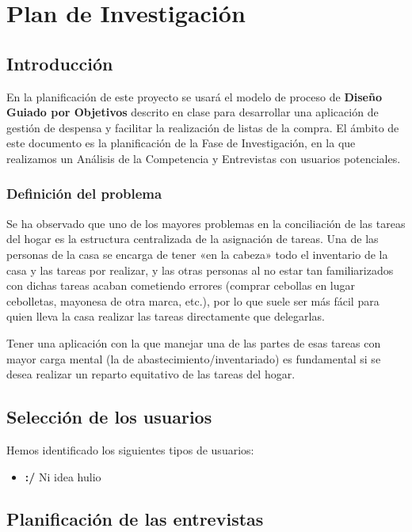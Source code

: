 \chapter{Plan de Investigación}

\section{Introducción}
En la planificación de este proyecto se usará el modelo de proceso de \textbf{Diseño Guiado por Objetivos} descrito en clase para desarrollar una aplicación de gestión de despensa y facilitar la realización de listas de la compra. El ámbito de este documento es la planificación de la Fase de Investigación, en la que realizamos un Análisis de la Competencia y Entrevistas con usuarios potenciales.

\subsection{Definición del problema}
Se ha observado que uno de los mayores problemas en la conciliación de las tareas del hogar es la estructura centralizada de la asignación de tareas. Una de las personas de la casa se encarga de tener «en la cabeza» todo el inventario de la casa y las tareas por realizar, y las otras personas al no estar tan familiarizados con dichas tareas acaban cometiendo errores (comprar cebollas en lugar cebolletas, mayonesa de otra marca, etc.), por lo que suele ser más fácil para quien lleva la casa realizar las tareas directamente que delegarlas.

Tener una aplicación con la que manejar una de las partes de esas tareas con mayor carga mental (la de abastecimiento/inventariado) es fundamental si se desea realizar un reparto equitativo de las tareas del hogar.

\section{Selección de los usuarios}
Hemos identificado los siguientes tipos de usuarios:
\begin{itemize}
    \item \textbf{:/} Ni idea hulio
\end{itemize}

\section{Planificación de las entrevistas}

